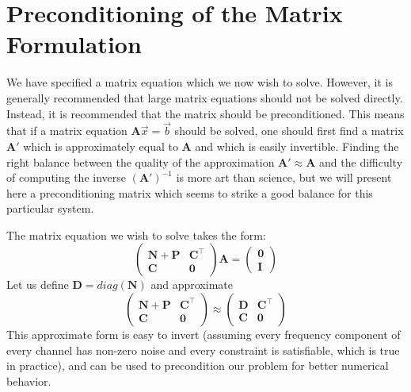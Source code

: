 \section{Preconditioning of the Matrix Formulation}

We have specified a matrix equation which we now wish to solve.  However, it is generally recommended that large matrix equations should not be solved directly.  Instead, it is recommended that the matrix should be preconditioned.  This means that if a matrix equation $\mathbf{A}\vec{x} = \vec{b}$ should be solved, one should first find a matrix $\mathbf{A}'$ which is approximately equal to $\mathbf{A}$ and which is easily invertible.  Finding the right balance between the quality of the approximation $\mathbf{A}' \approx \mathbf{A}$ and the difficulty of computing the inverse $\left(\mathbf{A}'\right)^{-1}$ is more art than science, but we will present here a preconditioning matrix which seems to strike a good balance for this particular system.

The matrix equation we wish to solve takes the form:
\begin{equation}\begin{pmatrix}
\mathbf{N}+\mathbf{P} & \mathbf{C}^\top\\
\mathbf{C} & \mathbf{0}
\end{pmatrix}
\mathbf{A} = 
\begin{pmatrix}
\mathbf{0} \\ \mathbf{I}
\end{pmatrix}\end{equation}
Let us define $\mathbf{D} = diag(\mathbf{N})$ and approximate
\begin{equation}\begin{pmatrix}
\mathbf{N}+\mathbf{P} & \mathbf{C}^\top\\
\mathbf{C} & \mathbf{0}
\end{pmatrix}
\approx
\begin{pmatrix}
\mathbf{D} & \mathbf{C}^\top \\
\mathbf{C} & \mathbf{0}
\end{pmatrix}\end{equation}
This approximate form is easy to invert (assuming every frequency component of every channel has non-zero noise and every constraint is satisfiable, which is true in practice), and can be used to precondition our problem for better numerical behavior.

